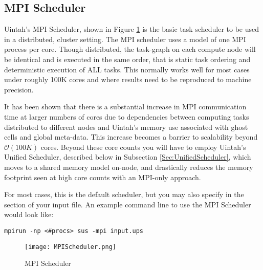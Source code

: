\subsection{MPI Scheduler} \label{Sec:MPIScheduler}
Uintah's MPI Scheduler, shown in Figure \ref{fig:MPIScheduler} is the basic
task scheduler to be used in a distributed, cluster setting. The MPI scheduler
uses a model of one MPI process per core. Though distributed, the task-graph
on
each compute node will be identical and is executed in the same order, that is
static task ordering and deterministic execution of ALL tasks. This normally
works well for most cases under roughly 100K cores and where results need to
be
reproduced to machine precision.

It has been shown that there is a substantial increase in MPI communication
time at larger numbers of cores due to dependencies between computing tasks
distributed to different nodes and Uintah's memory use associated with ghost
cells and global meta-data. This increase becomes a barrier to scalability
beyond $\mathcal{O}(100K)$ cores. Beyond these core counts you will have to
employ Uintah's Unified Scheduler, described below in Subsection
\ref{Sec:UnifiedScheduler}, which moves to a shared memory model on-node, and
drastically reduces the memory footprint seen at high core counts with an
MPI-only approach.

For most cases, this is the default scheduler, but you may also specify
 in the  section of your input file. An example
command
line to use the MPI Scheduler would look like:

\begin{Verbatim}[fontsize=\footnotesize]
mpirun -np <#procs> sus -mpi input.ups
\end{Verbatim}

\begin{figure}[H]
  \centering
  \texttt{[image: MPIScheduler.png]}
  \caption{MPI Scheduler}
  \label{fig:MPIScheduler}
\end{figure}



